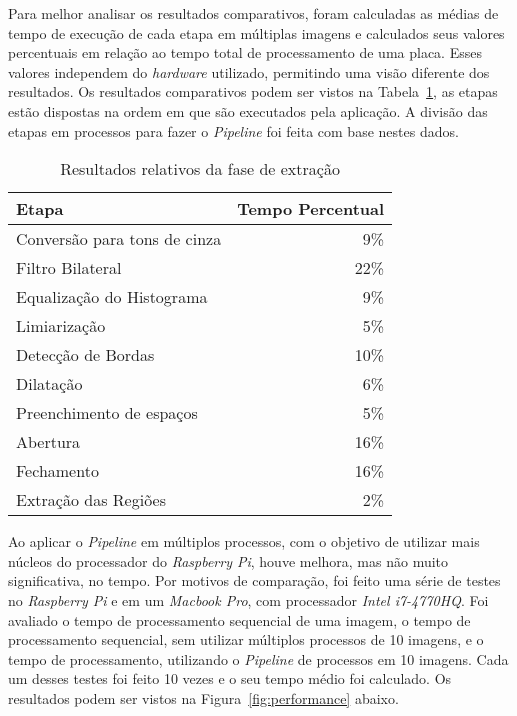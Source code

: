 Para melhor analisar os resultados comparativos, foram calculadas as médias de
tempo de execução de cada etapa em múltiplas imagens e calculados seus valores
percentuais em relação ao tempo total de processamento de uma placa. Esses
valores independem do \emph{hardware} utilizado, permitindo uma visão diferente dos resultados. 
Os resultados comparativos podem ser vistos na Tabela~\ref{tab:resultados_relativos}, as etapas 
estão dispostas na ordem em que são executados pela aplicação. A divisão
das etapas em processos para fazer o \emph{Pipeline} foi feita com base nestes dados.

\begin{table}[H]
\centering
\caption{Resultados relativos da fase de extração}
\label{tab:resultados_relativos}
\begin{tabular}{@{}lr@{}}
\toprule
Etapa                        & Tempo Percentual \\ \midrule
Conversão para tons de cinza & 9\%             \\
Filtro Bilateral             & 22\%             \\
Equalização do Histograma    & 9\%             \\
Limiarização                 & 5\%             \\
Detecção de Bordas           & 10\%             \\
Dilatação                    & 6\%             \\
Preenchimento de espaços     & 5\%             \\
Abertura                     & 16\%             \\
Fechamento                   & 16\%             \\
Extração das Regiões         & 2\%             \\ \bottomrule
\end{tabular}
\end{table}

Ao aplicar o \emph{Pipeline} em múltiplos processos, com o objetivo de
utilizar mais núcleos do processador do \emph{Raspberry Pi}, houve melhora, mas
não muito significativa, no tempo. Por motivos de comparação, foi feito
uma série de testes no \emph{Raspberry Pi} e em um 
\emph{Macbook Pro}, com processador \emph{Intel i7-4770HQ}. Foi avaliado o tempo de processamento
sequencial de uma imagem, o tempo de processamento sequencial, sem utilizar múltiplos processos
de 10 imagens, e o tempo de processamento, utilizando o \emph{Pipeline} de processos
em 10 imagens. Cada um desses testes foi feito 10 vezes e o seu tempo médio foi calculado.
Os resultados podem ser vistos na Figura~\ref{fig:performance} abaixo.

